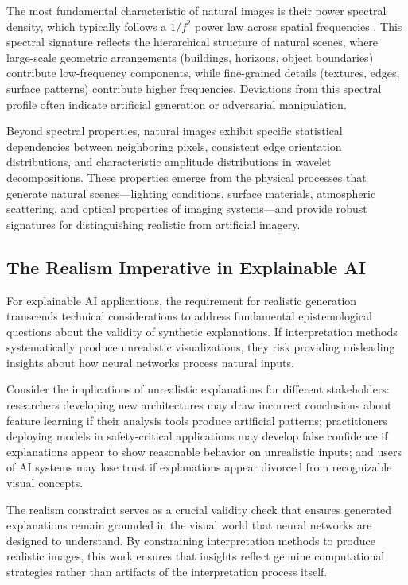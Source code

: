 The most fundamental characteristic of natural images is their power spectral density, which typically follows a $1/f^2$ power law across spatial frequencies \citep{field1987relations}. This spectral signature reflects the hierarchical structure of natural scenes, where large-scale geometric arrangements (buildings, horizons, object boundaries) contribute low-frequency components, while fine-grained details (textures, edges, surface patterns) contribute higher frequencies. Deviations from this spectral profile often indicate artificial generation or adversarial manipulation.

Beyond spectral properties, natural images exhibit specific statistical dependencies between neighboring pixels, consistent edge orientation distributions, and characteristic amplitude distributions in wavelet decompositions. These properties emerge from the physical processes that generate natural scenes—lighting conditions, surface materials, atmospheric scattering, and optical properties of imaging systems—and provide robust signatures for distinguishing realistic from artificial imagery.

\subsection{The Realism Imperative in Explainable AI}

For explainable AI applications, the requirement for realistic generation transcends technical considerations to address fundamental epistemological questions about the validity of synthetic explanations. If interpretation methods systematically produce unrealistic visualizations, they risk providing misleading insights about how neural networks process natural inputs.

Consider the implications of unrealistic explanations for different stakeholders: researchers developing new architectures may draw incorrect conclusions about feature learning if their analysis tools produce artificial patterns; practitioners deploying models in safety-critical applications may develop false confidence if explanations appear to show reasonable behavior on unrealistic inputs; and users of AI systems may lose trust if explanations appear divorced from recognizable visual concepts.

The realism constraint serves as a crucial validity check that ensures generated explanations remain grounded in the visual world that neural networks are designed to understand. By constraining interpretation methods to produce realistic images, this work ensures that insights reflect genuine computational strategies rather than artifacts of the interpretation process itself.

